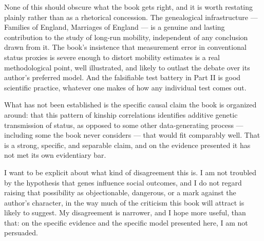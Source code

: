 \documentclass[12pt]{article}
\begin{document}
None of this should obscure what the book gets right, and it is worth
restating plainly rather than as a rhetorical concession. The genealogical
infrastructure --- Families of England, Marriages of England --- is a
genuine and lasting contribution to the study of long-run mobility,
independent of any conclusion drawn from it. The book's insistence that
measurement error in conventional status proxies is severe enough to distort
mobility estimates is a real methodological point, well illustrated, and
likely to outlast the debate over its author's preferred model. And the
falsifiable test battery in Part II is good scientific practice, whatever
one makes of how any individual test comes out.

What has not been established is the specific causal claim the book is
organized around: that this pattern of kinship correlations identifies
additive genetic transmission of status, as opposed to some other
data-generating process --- including some the book never considers --- that
would fit comparably well. That is a strong, specific, and separable claim,
and on the evidence presented it has not met its own evidentiary bar.

I want to be explicit about what kind of disagreement this is. I am not
troubled by the hypothesis that genes influence social outcomes, and I do
not regard raising that possibility as objectionable, dangerous, or a mark
against the author's character, in the way much of the criticism this book
will attract is likely to suggest. My disagreement is narrower, and I hope
more useful, than that: on the specific evidence and the specific model
presented here, I am not persuaded.




\clearpage
\end{document}
